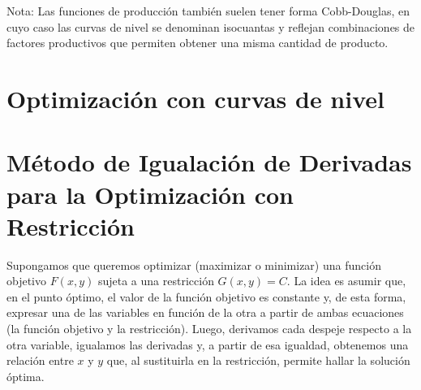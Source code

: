 \documentclass{article}
\begin{document}
\vspace{0.5em}
{\color{teal}Nota:} {\color{teal}Las funciones de producción también suelen tener forma Cobb-Douglas}, en cuyo caso las curvas de nivel se denominan {\color{teal}isocuantas} y reflejan {\color{teal}combinaciones de factores productivos} que permiten obtener una misma cantidad de producto.





\newpage

\section{Optimización con curvas de nivel}


\section*{Método de Igualación de Derivadas para la Optimización con Restricción}

Supongamos que queremos optimizar (maximizar o minimizar) una función objetivo \(F(x,y)\) sujeta a una restricción \(G(x,y)=C\). La idea es asumir que, en el punto óptimo, el valor de la función objetivo es constante y, de esta forma, expresar una de las variables en función de la otra a partir de ambas ecuaciones (la función objetivo y la restricción). Luego, derivamos cada despeje respecto a la otra variable, igualamos las derivadas y, a partir de esa igualdad, {\color{teal}obtenemos una relación entre \(x\) y \(y\) que, al sustituirla en la restricción, permite hallar la solución óptima.}
\end{document}
